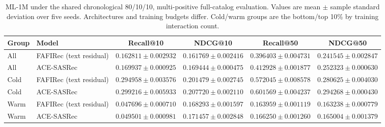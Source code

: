 \begin{table}[t]
\centering
\small
\setlength{\tabcolsep}{4pt}
\caption{ML-1M under the shared chronological 80/10/10, multi-positive full-catalog evaluation. Values are mean $\pm$ sample standard deviation over five seeds. Architectures and training budgets differ. Cold/warm groups are the bottom/top 10\% by training interaction count.}
\label{tab:ace-ml1m-common-protocol}
\begin{tabular}{llcccc}
\hline
Group & Model & Recall@10 & NDCG@10 & Recall@50 & NDCG@50 \\
\hline
All & FAFIRec (text residual) & $0.162811 \pm 0.002932$ & $0.161769 \pm 0.002416$ & $0.396403 \pm 0.004731$ & $0.241545 \pm 0.002847$ \\
All & ACE-SASRec~\cite{Lee2026ACE} & $0.169937 \pm 0.000925$ & $0.169444 \pm 0.000475$ & $0.412928 \pm 0.001877$ & $0.252323 \pm 0.000630$ \\
\hline
Cold & FAFIRec (text residual) & $0.294958 \pm 0.003576$ & $0.201479 \pm 0.002745$ & $0.572045 \pm 0.008578$ & $0.280625 \pm 0.004030$ \\
Cold & ACE-SASRec~\cite{Lee2026ACE} & $0.299216 \pm 0.005933$ & $0.207720 \pm 0.002110$ & $0.601569 \pm 0.004237$ & $0.294268 \pm 0.000430$ \\
\hline
Warm & FAFIRec (text residual) & $0.047696 \pm 0.000710$ & $0.168293 \pm 0.001597$ & $0.163959 \pm 0.001119$ & $0.163238 \pm 0.000779$ \\
Warm & ACE-SASRec~\cite{Lee2026ACE} & $0.049501 \pm 0.000981$ & $0.171457 \pm 0.002848$ & $0.166250 \pm 0.001260$ & $0.165004 \pm 0.001379$ \\
\hline
\end{tabular}
\end{table}
